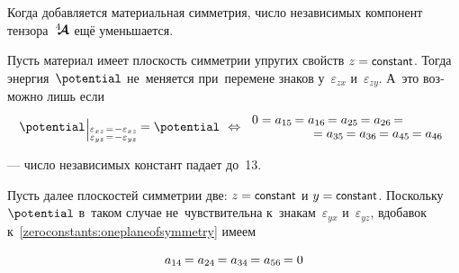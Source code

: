 \begin{otherlanguage}{russian}
Когда добавляется материальная симметрия, число независимых компонент тензора~$\hspace{.08ex}{^4\hspace{-0.7ex}\bm{\mathcal{A}}}\hspace{.08ex}$ ещё уменьшается.

Пусть материал имеет плоскость симметрии упругих свойств ${z = \constant}$.
Тогда энергия~$\potential$ не~меняется при~перемене знаков у~$\varepsilon_{zx}$ и~$\varepsilon_{zy}$.
А~это возможно лишь если
\begin{equation}\label{zeroconstants:oneplaneofsymmetry}
\potential \hspace{.1ex} \raisemath{-0.2em}{\Bigr\vert}_{\substack{%
\varepsilon_{xz} \hspace{.2ex}=\hspace{.2ex} -\varepsilon_{xz} \\
\varepsilon_{yz} \hspace{.2ex}=\hspace{.2ex} -\varepsilon_{yz}
}} \hspace{-0.2ex} = \potential
\:\,\Leftrightarrow \hspace{-3em}
\begin{array}{c}
0 =
a_{15} \hspace{-0.2ex} = a_{16} \hspace{-0.2ex} = a_{25} \hspace{-0.2ex} = a_{26} \hspace{-0.2ex} =
\\[-0.1em]
\hspace{8em} = a_{35} \hspace{-0.2ex} = a_{36} \hspace{-0.2ex} = a_{45} \hspace{-0.2ex} = a_{46}
\end{array}
\vspace{.1em}\end{equation}

\noindent
--- число независимых констант падает до~13.

Пусть далее плоскостей симметрии две: ${z = \constant}$ и ${y = \constant}$.
Поскольку~$\potential$ в~таком случае не~чувствительна к~знакам~$\varepsilon_{yx}$ и~$\varepsilon_{yz}$, вдобавок к~\eqref{zeroconstants:oneplaneofsymmetry} имеем

\nopagebreak\vspace{-0.22em}\begin{equation}\label{zeroconstants:2orthogonalplanesofsymmetry:orthotropic}
a_{14} \hspace{-0.2ex} = a_{24} \hspace{-0.2ex} = a_{34} \hspace{-0.2ex} = a_{56} \hspace{-0.2ex} = 0
\end{equation}


\end{otherlanguage}
